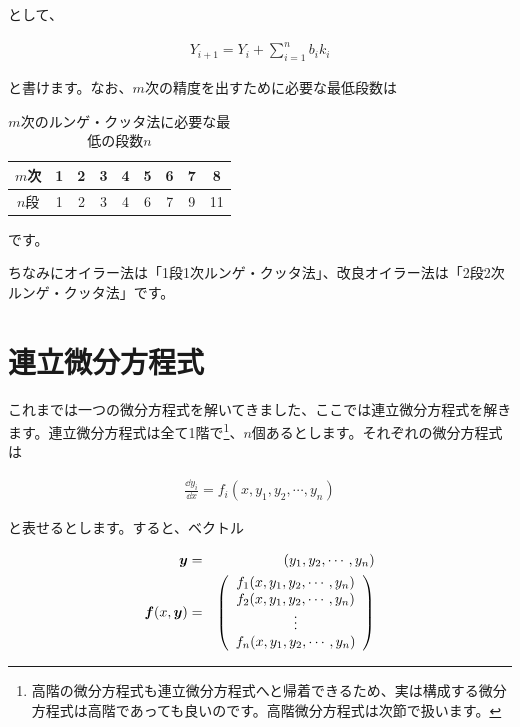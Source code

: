\noindent
として、

\begin{eqnarray}
    Y_{i+1}=Y_i+\sum_{i=1}^n b_i k_i
\end{eqnarray}

\noindent
と書けます。なお、$m$次の精度を出すために必要な最低段数は

\begin{table}[htb]
\begin{center}
  \caption{$m$次のルンゲ・クッタ法に必要な最低の段数$n$}
  \begin{tabular}{c|cccccccc}
    $m$次 & 1 & 2 & 3 & 4 & 5 & 6 & 7 & 8 \\
    \hline
    $n$段 & 1 & 2 & 3 & 4 & 6 & 7 & 9 & 11 \\
  \end{tabular}
  \end{center}
\end{table}

\noindent
です。

ちなみにオイラー法は「1段1次ルンゲ・クッタ法」、改良オイラー法は「2段2次ルンゲ・クッタ法」です。









\section{連立微分方程式}
\label{numerical-multiple}
これまでは一つの微分方程式を解いてきました、ここでは連立微分方程式を解きます。連立微分方程式は全て1階で\footnote{高階の微分方程式も連立微分方程式へと帰着できるため、実は構成する微分方程式は高階であっても良いのです。高階微分方程式は次節で扱います。}、$n$個あるとします。それぞれの微分方程式は

\begin{eqnarray}
    \frac{\dd y_i}{\dd x}=f_i(x,y_1,y_2,\cdots,y_n)
\end{eqnarray}

\noindent
と表せるとします。すると、ベクトル

\begin{eqnarray}
    \boldsymbol{y}&=&(y_1,y_2,\cdots,y_n) \\
    \boldsymbol{f}(x,\boldsymbol{y})&=&\pqty{
    \begin{array}{c}
        f_1(x,y_1,y_2,\cdots,y_n) \\
        f_2(x,y_1,y_2,\cdots,y_n) \\
        \vdots \\
        f_n(x,y_1,y_2,\cdots,y_n)
    \end{array}
    }
\end{eqnarray}

